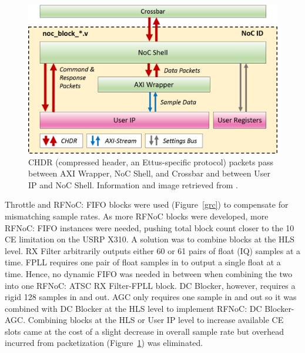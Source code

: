 \documentclass{article}
\begin{document}
\begin{figure}[h]
  \begin{center}
    \centerline{\includegraphics[width=\columnwidth]{noc.png}}
    \caption{CHDR (compressed header, an Ettus-specific protocol) packets pass between AXI Wrapper, NoC Shell, and Crossbar and between User IP and NoC Shell. Information and image retrieved from \cite{rfnockb}.}
    \label{noc}
  \end{center}
\end{figure}

Throttle and RFNoC: FIFO blocks were used  (Figure~\ref{grc}) to compensate for mismatching sample rates. As more RFNoC blocks were developed, more RFNoC: FIFO instances were needed, pushing total block count closer to the 10 CE limitation on the USRP X310. A solution was to combine blocks at the HLS level. RX Filter arbitrarily outputs either 60 or 61 pairs of float (IQ) samples at a time. FPLL requires one pair of float samples in to output a single float at a time. Hence, no dynamic FIFO was needed in between when combining the two into one RFNoC: ATSC RX Filter-FPLL block. DC Blocker, however, requires a rigid 128 samples in and out. AGC only requires one sample in and out so it was combined with DC Blocker at the HLS level to implement RFNoC: DC Blocker-AGC. Combining blocks at the HLS or User IP level to increase available CE slots came at the cost of a slight decrease in overall sample rate but overhead incurred from packetization (Figure~\ref{noc}) was eliminated.
\end{document}

